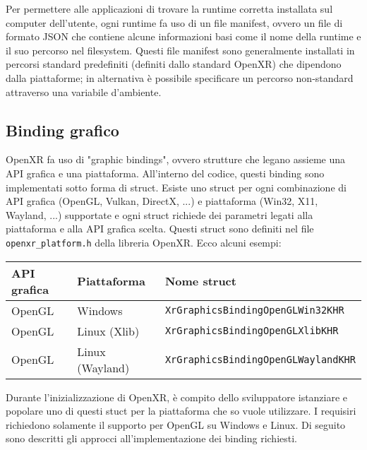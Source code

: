 \documentclass[twoside]{supsistudent}
\begin{document}
Per permettere alle applicazioni di trovare la runtime corretta installata sul computer dell'utente, ogni runtime fa uso di un file manifest, ovvero un file di formato JSON che contiene alcune informazioni basi come il nome della runtime e il suo percorso nel filesystem. Questi file manifest sono generalmente installati in percorsi standard predefiniti (definiti dallo standard OpenXR) che dipendono dalla piattaforme; in alternativa è possibile specificare un percorso non-standard attraverso una variabile d'ambiente.


\subsection{Binding grafico}

OpenXR fa uso di "graphic bindings", ovvero strutture che legano assieme una API grafica e una piattaforma. All'interno del codice, questi binding sono implementati sotto forma di struct. Esiste uno struct per ogni combinazione di API grafica (OpenGL, Vulkan, DirectX, ...) e piattaforma (Win32, X11, Wayland, ...) supportate e ogni struct richiede dei parametri legati alla piattaforma e alla API grafica scelta. Questi struct sono definiti nel file \texttt{openxr\_platform.h} della libreria OpenXR. Ecco alcuni esempi:

\begin{center}
  \begin{tabular}{ l l l }
    API grafica & Piattaforma & Nome struct \\
    \hline
    OpenGL      & Windows         & \texttt{XrGraphicsBindingOpenGLWin32KHR} \\
    OpenGL      & Linux (Xlib)    & \texttt{XrGraphicsBindingOpenGLXlibKHR} \\
    OpenGL      & Linux (Wayland) & \texttt{XrGraphicsBindingOpenGLWaylandKHR}
  \end{tabular}
\end{center}

Durante l'inizializzazione di OpenXR, è compito dello sviluppatore istanziare e popolare uno di questi stuct per la piattaforma che so vuole utilizzare. I requisiri richiedono solamente il supporto per OpenGL su Windows e Linux. Di seguito sono descritti gli approcci all'implementazione dei binding richiesti.
\end{document}
